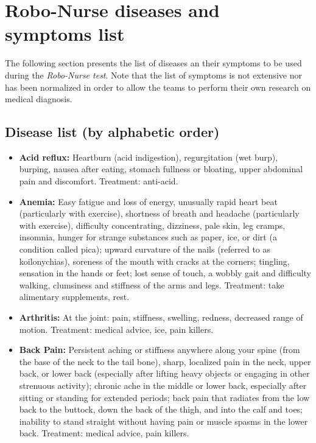 \chapter{Robo-Nurse diseases and symptoms list}

The following section presents the list of diseases an their symptoms to be used during the \textit{Robo-Nurse test}. Note that the list of symptoms is not extensive nor has been normalized in order to allow the teams to perform their own research on medical diagnosis.

\section{Disease list (by alphabetic order)}

\begin{itemize}

\item \textbf{Acid reflux:} Heartburn (acid indigestion), regurgitation (wet burp), burping, nausea after eating, stomach fullness or bloating, upper abdominal pain and discomfort. Treatment: anti-acid.

\item \textbf{Anemia:} Easy fatigue and loss of energy, unusually rapid heart beat (particularly with exercise), shortness of breath and headache (particularly with exercise), difficulty concentrating, dizziness, pale skin, leg cramps, insomnia, hunger for strange substances such as paper, ice, or dirt (a condition called pica); upward curvature of the nails (referred to as koilonychias), soreness of the mouth with cracks at the corners; tingling,  sensation in the hands or feet; lost sense of touch, a wobbly gait and difficulty walking, clumsiness and stiffness of the arms and legs. Treatment: take alimentary supplements, rest.

\item \textbf{Arthritis:} At the joint: pain, stiffness, swelling, redness, decreased range of motion. Treatment: medical advice, ice, pain killers.

\item \textbf{Back Pain:} Persistent aching or stiffness anywhere along your spine (from the base of the neck to the tail bone), sharp, localized pain in the neck, upper back, or lower back (especially after lifting heavy objects or engaging in other strenuous activity); chronic ache in the middle or lower back, especially after sitting or standing for extended periods; back pain that radiates from the low back to the buttock, down the back of the thigh, and into the calf and toes; inability to stand straight without having pain or muscle spasms in the lower back. Treatment: medical advice, pain killers.


\end{itemize}

